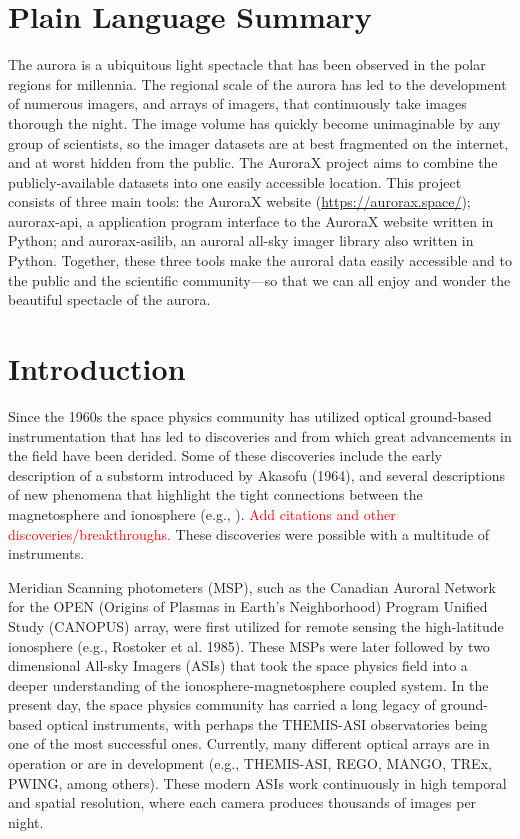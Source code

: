 \documentclass[draft]{agujournal2019}
\begin{document}
\section*{Plain Language Summary}
\noindent The aurora is a ubiquitous light spectacle that has been observed in the polar regions for millennia. The regional scale of the aurora has led to the development of numerous imagers, and arrays of imagers, that continuously take images thorough the night. The image volume has quickly become unimaginable by any group of scientists, so the imager datasets are at best fragmented on the internet, and at worst hidden from the public. The AuroraX project aims to combine the publicly-available datasets into one easily accessible location. This project consists of three main tools:  the AuroraX website (\url{https://aurorax.space/}); aurorax-api, a application program interface to the AuroraX website written in Python; and aurorax-asilib, an auroral all-sky imager library also written in Python. Together, these three tools make the auroral data easily accessible and to the public and the scientific community---so that we can all enjoy and wonder the beautiful spectacle of the aurora.


\section{Introduction}\label{intro}
Since the 1960s the space physics community has utilized optical ground-based instrumentation that has led to discoveries and from which great advancements in the field have been derided. Some of these discoveries include the early description of a substorm introduced by Akasofu (1964), and several descriptions of new phenomena that highlight the tight connections between the magnetosphere and ionosphere (e.g., ). \textcolor{red}{Add citations and other discoveries/breakthroughs.} These discoveries were possible with a multitude of instruments. 

Meridian Scanning photometers (MSP), such as the Canadian Auroral Network for the OPEN (Origins of Plasmas in Earth's Neighborhood) Program Unified Study (CANOPUS) array, were first utilized for remote sensing the high-latitude ionosphere (e.g., Rostoker et al. 1985). These MSPs were later followed by two dimensional All-sky Imagers (ASIs) that took the space physics field into a deeper understanding of the ionosphere-magnetosphere coupled system. In the present day, the space physics community has carried a long legacy of ground-based optical instruments, with perhaps the THEMIS-ASI observatories being one of the most successful ones. Currently, many different optical arrays are in operation or are in development (e.g., THEMIS-ASI, REGO, MANGO, TREx, PWING, among others). These modern ASIs work continuously in high temporal and spatial resolution, where each camera produces thousands of images per night.
\end{document}

